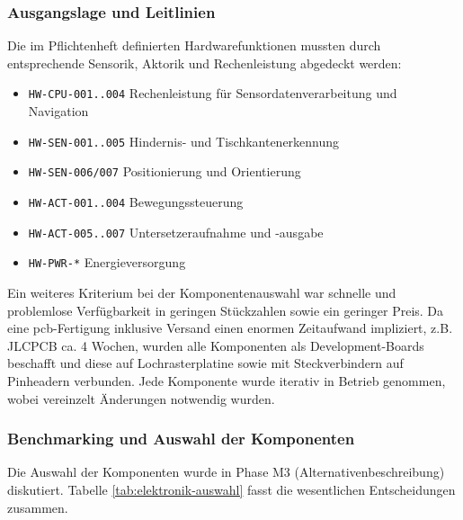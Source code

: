 
\subsubsection*{Ausgangslage und Leitlinien}

Die im Pflichtenheft definierten Hardwarefunktionen mussten durch entsprechende Sensorik, Aktorik und Rechenleistung abgedeckt werden:
\begin{itemize}
\item \texttt{HW-CPU-001..004} Rechenleistung für Sensordatenverarbeitung und Navigation
\item \texttt{HW-SEN-001..005} Hindernis- und Tischkantenerkennung
\item \texttt{HW-SEN-006/007} Positionierung und Orientierung
\item \texttt{HW-ACT-001..004} Bewegungssteuerung
\item \texttt{HW-ACT-005..007} Untersetzeraufnahme und -ausgabe
\item \texttt{HW-PWR-*} Energieversorgung
\end{itemize}

Ein weiteres Kriterium bei der Komponentenauswahl war schnelle und problemlose Verfügbarkeit in geringen Stückzahlen sowie ein geringer Preis. Da eine \gls{pcb}-Fertigung inklusive Versand einen enormen Zeitaufwand impliziert, z.B. JLCPCB ca. 4 Wochen, wurden alle Komponenten als Development-Boards beschafft und diese auf Lochrasterplatine sowie mit Steckverbindern auf Pinheadern verbunden. Jede Komponente wurde iterativ in Betrieb genommen, wobei vereinzelt Änderungen notwendig wurden.

\subsubsection*{Benchmarking und Auswahl der Komponenten}

Die Auswahl der Komponenten wurde in Phase M3 (Alternativenbeschreibung) diskutiert. Tabelle \ref{tab:elektronik-auswahl} fasst die wesentlichen Entscheidungen zusammen. 

